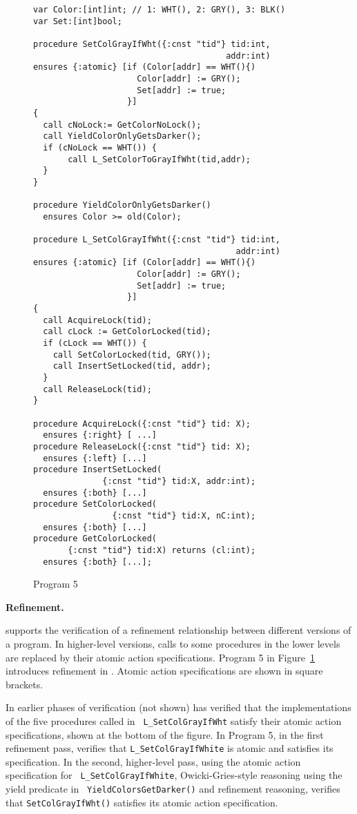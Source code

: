\begin{figure}
\begin{verbatim}
var Color:[int]int; // 1: WHT(), 2: GRY(), 3: BLK()
var Set:[int]bool;

procedure SetColGrayIfWht({:cnst "tid"} tid:int,
                                       addr:int)
ensures {:atomic} [if (Color[addr] == WHT(){)
                     Color[addr] := GRY();
                     Set[addr] := true;
                   }]
{
  call cNoLock:= GetColorNoLock();
  call YieldColorOnlyGetsDarker();
  if (cNoLock == WHT()) {
       call L_SetColorToGrayIfWht(tid,addr);
  }
}

procedure YieldColorOnlyGetsDarker()
  ensures Color >= old(Color);

procedure L_SetColGrayIfWht({:cnst "tid"} tid:int,
                                         addr:int)
ensures {:atomic} [if (Color[addr] == WHT(){)
                     Color[addr] := GRY();
                     Set[addr] := true;
                   }]
{
  call AcquireLock(tid);
  call cLock := GetColorLocked(tid);
  if (cLock == WHT()) {
    call SetColorLocked(tid, GRY());
    call InsertSetLocked(tid, addr);
  } 
  call ReleaseLock(tid);
}

procedure AcquireLock({:cnst "tid"} tid: X);
  ensures {:right} [ ...]
procedure ReleaseLock({:cnst "tid"} tid: X);
  ensures {:left} [...]
procedure InsertSetLocked(
              {:cnst "tid"} tid:X, addr:int); 
  ensures {:both} [...]
procedure SetColorLocked(
                {:cnst "tid"} tid:X, nC:int); 
  ensures {:both} [...]
procedure GetColorLocked(
       {:cnst "tid"} tid:X) returns (cl:int);
  ensures {:both} [...];

\end{verbatim}
\caption{Program 5}
\label{fig:reft}
\end{figure}

{\bf Refinement.} 

\civl supports the
verification of a refinement relationship between different versions of a
program. In higher-level versions, calls to some procedures in the
lower levels are
replaced by their atomic action specifications. 
Program 5 in Figure~\ref{fig:reft} introduces refinement in \civl. 
Atomic action specifications are shown in square brackets. 

In earlier phases of verification (not shown) \civl has verified that
the implementations of the five procedures called in {\tt
  L\_SetColGrayIfWht} satisfy their atomic action specifications, shown
at the bottom of the figure. In Program 5, in the first refinement
pass, \civl verifies that {\tt L\_SetColGrayIfWhite} is atomic and
satisfies its specification. In the second, higher-level 
pass, using the atomic action specification for {\tt
  L\_SetColGrayIfWhite}, Owicki-Gries-style reasoning using the yield
predicate in {\tt
  YieldColorsGetDarker()} and refinement reasoning, \civl verifies
that {\tt SetColGrayIfWht()} satisfies its atomic action
specification. 

